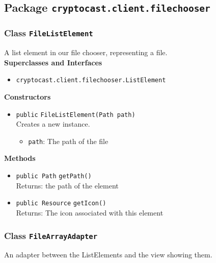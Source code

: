 \subsection{Package \lstinline!cryptocast.client.filechooser!}

\subsubsection{Class \lstinline|FileListElement|}
A list element in our file chooser, representing a file. \\


\textbf{Superclasses and Interfaces}
\begin{itemize}
\item \lstinline|cryptocast.client.filechooser.ListElement|
\end{itemize}



\textbf{Constructors}
\begin{itemize}
\item \lstinline|public| \lstinline|FileListElement|\lstinline|(Path path)|\\
Creates a new instance.
\begin{itemize}
\item \lstinline|path|: The path of the file
\end{itemize}



\end{itemize}


\textbf{Methods}
\begin{itemize}
\item \lstinline|public Path| \lstinline|getPath|\lstinline|()|\\
Returns: the path of the element



\item \lstinline|public Resource| \lstinline|getIcon|\lstinline|()|\\
Returns: The icon associated with this element



\end{itemize}

\subsubsection{Class \lstinline|FileArrayAdapter|}
An adapter between the ListElements and the view showing them. \\


